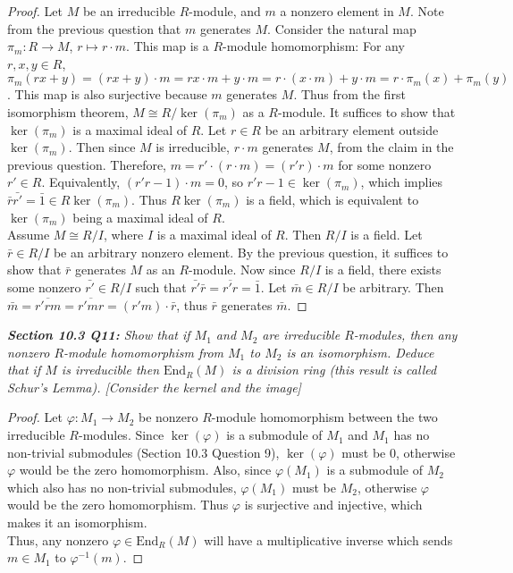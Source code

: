 \documentclass{article}
\begin{document}
  \begin{proof}
    Let $M$ be an irreducible $R$-module, and $m$ a nonzero element in $M$.
    Note from the previous question that $m$ generates $M$. Consider the
    natural map $\pi_m:R\rightarrow M$, $r\mapsto r\cdot m$. This map is
    a $R$-module homomorphism: For any $r,x,y\in R$,
    $\pi_m(rx+y)=(rx+y)\cdot m=rx\cdot m+y\cdot m =r\cdot(x\cdot m)+y\cdot
    m =r\cdot\pi_m(x)+\pi_m(y)$. This map is also surjective because $m$
    generates $M$. Thus from the first isomorphism theorem, $M\cong
    R/\ker(\pi_m)$ as a $R$-module. It suffices to show that $\ker(\pi_m)$
    is a maximal ideal of $R$. Let $r\in R$ be an arbitrary element outside
    $\ker(\pi_m)$. Then since $M$ is irreducible, $r\cdot m$ generates $M$,
    from the claim in the previous question. Therefore, $m=r'\cdot(r\cdot
    m)=(r'r)\cdot m$ for some nonzero $r'\in R$. Equivalently,
    $(r'r-1)\cdot m=0$, so $r'r-1\in\ker(\pi_m)$, which implies
    $\bar{r}\bar{r'}=\bar{1}\in R\ker(\pi_m)$. Thus $R\ker(\pi_m)$ is a
    field, which is equivalent to $\ker(\pi_m)$ being a maximal ideal of
    $R$. \\

    Assume $M\cong R/I$, where $I$ is a maximal ideal of $R$. Then $R/I$ is
    a field. Let $\bar{r}\in R/I$ be an arbitrary nonzero element. By the
    previous question, it suffices to show that $\bar{r}$ generates $M$ as
    an $R$-module. Now since $R/I$ is a field, there exists some nonzero
    $\bar{r'}\in R/I$ such that $\bar{r'}\bar{r}=\overline{r'r}=\bar{1}$. Let
    $\bar{m}\in R/I$ be arbitrary. Then
    $\bar{m}=\overline{r'rm}=\overline{r'mr}=(r'm)\cdot\bar{r}$, thus
    $\bar{r}$ generates $\bar{m}$.
  \end{proof}

\it \textbf{Section 10.3 Q11:} Show that if $M_1$ and $M_2$ are irreducible
  $R$-modules, then any nonzero $R$-module homomorphism from $M_1$ to $M_2$
  is an isomorphism. Deduce that if $M$ is irreducible then
  $\text{End}_R(M)$ is a division ring (this result is called Schur's
  Lemma). [Consider the kernel and the image]

  \begin{proof}
    Let $\varphi:M_1\rightarrow M_2$ be nonzero $R$-module homomorphism
    between the two irreducible $R$-modules. Since $\ker(\varphi)$ is a
    submodule of $M_1$ and $M_1$ has no non-trivial submodules (Section
    10.3 Question 9), $\ker(\varphi)$ must be 0, otherwise $\varphi$ would
    be the zero homomorphism. Also, since $\varphi(M_1)$ is a submodule of
    $M_2$ which also has no non-trivial submodules, $\varphi(M_1)$ must be
    $M_2$, otherwise $\varphi$ would be the zero homomorphism. Thus
    $\varphi$ is surjective and injective, which makes it an isomorphism.
    \\

    Thus, any nonzero $\varphi\in\text{End}_R(M)$ will have a
    multiplicative inverse which sends $m\in M_1$ to $\varphi^{-1}(m)$.
  \end{proof}
\end{document}
